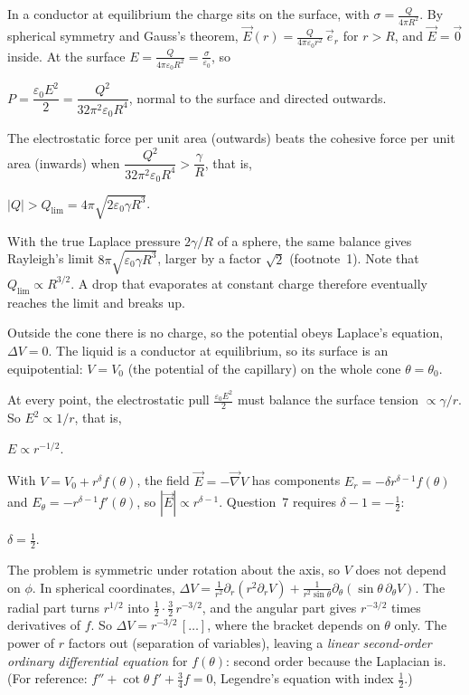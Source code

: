 \documentclass[11pt,a4paper]{article}
\newcommand{\vv}[1]{\vec{#1}}
\begin{document}
In a conductor at equilibrium the charge sits on the surface, with $\sigma = \frac{Q}{4\pi R^2}$.
By spherical symmetry and Gauss's theorem,
$\vv E(r) = \frac{Q}{4\pi\varepsilon_0r^2}\,\vv e_r$ for $r > R$, and $\vv E = \vv 0$ inside.
At the surface $E = \frac{Q}{4\pi\varepsilon_0R^2} = \frac\sigma{\varepsilon_0}$, so
\begin{result}
$P = \dfrac{\varepsilon_0E^2}{2} = \dfrac{Q^2}{32\pi^2\varepsilon_0R^4}$, normal to the surface
and directed outwards.
\end{result}

The electrostatic force per unit area (outwards) beats the cohesive force per unit area
(inwards) when
$\dfrac{Q^2}{32\pi^2\varepsilon_0R^4} > \dfrac\gamma R$, that is,
\begin{result}
$|Q| > Q_{\lim} = 4\pi\sqrt{2\varepsilon_0\gamma R^3}$.
\end{result}
With the true Laplace pressure $2\gamma/R$ of a sphere, the same balance gives Rayleigh's limit
$8\pi\sqrt{\varepsilon_0\gamma R^3}$, larger by a factor $\sqrt2$ (footnote~1). Note that
$Q_{\lim}\propto R^{3/2}$. A drop that evaporates at constant charge therefore eventually
reaches the limit and breaks up.


Outside the cone there is no charge, so the potential obeys Laplace's equation, $\Delta V = 0$.
The liquid is a conductor at equilibrium, so its surface is an equipotential: $V = V_0$ (the
potential of the capillary) on the whole cone $\theta = \theta_0$.

At every point, the electrostatic pull $\frac{\varepsilon_0E^2}2$ must balance the surface
tension $\propto\gamma/r$. So $E^2\propto1/r$, that is,
\begin{result}
$E \propto r^{-1/2}$.
\end{result}

With $V = V_0 + r^\delta f(\theta)$, the field $\vv E = -\vv\nabla V$ has components
$E_r = -\delta r^{\delta-1}f(\theta)$ and $E_\theta = -r^{\delta-1}f'(\theta)$, so
$|\vv E|\propto r^{\delta-1}$. Question~7 requires $\delta - 1 = -\frac12$:
\begin{result}
$\delta = \frac12$.
\end{result}

The problem is symmetric under rotation about the axis, so $V$ does not depend on $\phi$. In
spherical coordinates,
$\Delta V = \frac1{r^2}\partial_r(r^2\partial_rV) + \frac1{r^2\sin\theta}\partial_\theta(\sin\theta\,\partial_\theta V)$.
The radial part turns $r^{1/2}$ into $\frac12\cdot\frac32\,r^{-3/2}$, and the angular part
gives $r^{-3/2}$ times derivatives of $f$. So $\Delta V = r^{-3/2}\,[\dots]$, where the bracket
depends on $\theta$ only. The power of $r$ factors out (separation of variables), leaving a
\emph{linear second-order ordinary differential equation} for $f(\theta)$: second order because
the Laplacian is. (For reference: $f'' + \cot\theta\,f' + \frac34f = 0$, Legendre's equation
with index $\frac12$.)
\end{document}
